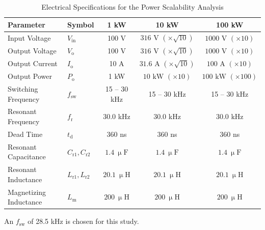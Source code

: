 \begin{table}[h!]
\centering
\caption{Electrical Specifications for the Power Scalability Analysis}
\label{tab:power_electrical_specs}
\begin{threeparttable}
\begin{tabular}{llccc}
\hline
\hline
\textbf{Parameter} & \textbf{Symbol} & \textbf{1 kW} & \textbf{10 kW} & \textbf{100 kW} \\
\hline
Input Voltage & $V_{\mathrm{in}}$ & 100 V & $316\text{ V } (\times\sqrt{10})$ & $1000\text{ V } (\times 10)$ \\
Output Voltage & $V_{\mathrm{o}}$ & 100 V & $316\text{ V } (\times\sqrt{10})$ & $1000\text{ V } (\times 10)$ \\
Output Current & $I_{\mathrm{o}}$ & 10 A & $31.6\text{ A } (\times\sqrt{10})$ & $100\text{ A } (\times 10)$ \\
Output Power & $P_{\mathrm{o}}$ & 1 kW & $10\text{ kW } (\times 10)$ & $100\text{ kW } (\times 100)$ \\
Switching Frequency\tnote{a}& $f_{\mathrm{sw}}$ & 15 -- 30 kHz & 15 -- 30 kHz & 15 -- 30 kHz \\
Resonant Frequency & $f_{\mathrm{r}}$ & 30.0 kHz & 30.0 kHz & 30.0 kHz \\
Dead Time & $t_{\mathrm{d}}$ & 360 ns & 360 ns & 360 ns \\
Resonant Capacitance & $C_{\mathrm{r1}}, C_{\mathrm{r2}}$ & $1.4~\upmu\text{F}$ & $1.4~\upmu\text{F}$ & $1.4~\upmu\text{F}$ \\
Resonant Inductance & $L_{\mathrm{r1}}, L_{\mathrm{r2}}$ & $20.1~\upmu\text{H}$ & $20.1~\upmu\text{H}$ & $20.1~\upmu\text{H}$ \\
Magnetizing Inductance & $L_{\mathrm{m}}$ & $200~\upmu\text{H}$ & $200~\upmu\text{H}$ & $200~\upmu\text{H}$ \\
\hline
\hline
\end{tabular}

\begin{tablenotes}
\small
\item[a] An $f_\mathrm{sw}$ of 28.5 kHz is chosen for this study.
\end{tablenotes}
\end{threeparttable}
\end{table}

